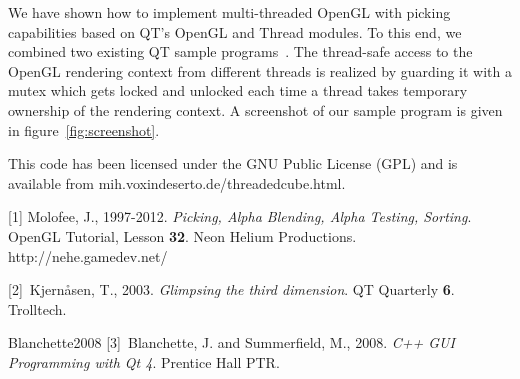 \documentclass[prodmode,acmtopc]{acmsmall}
\begin{document}
We have shown how to implement multi-threaded OpenGL with picking capabilities based on QT's OpenGL and Thread modules.
%
To this end, we combined two existing QT sample programs~\cite{glimpse3d,Blanchette2008}. 
%
The thread-safe access to the OpenGL rendering context from different threads is realized by guarding it with a mutex which gets locked and unlocked each time a thread takes temporary ownership of the rendering context.
%
A screenshot of our sample program is given in figure~\ref{fig:screenshot}.
%


This code has been licensed under the GNU Public License (GPL) and is available from {\sf mih.voxindeserto.de/threadedcube.html}.







\begin{thebibliography}{10}


[1] Molofee, J., 1997-2012. {\itshape Picking, Alpha Blending, Alpha Testing, Sorting}. OpenGL Tutorial, Lesson {\bf 32}. Neon Helium Productions. http://nehe.gamedev.net/


[2]~Kjern\r{a}sen, T., 2003. {\itshape Glimpsing the third dimension}. QT Quarterly {\bf 6}. Trolltech.

\bibitem%
{Blanchette2008} 
[3]~Blanchette, J. and Summerfield, M., 2008. {\itshape C++ GUI Programming with Qt
  4}.   Prentice Hall PTR.
\end{thebibliography}
\end{document}
